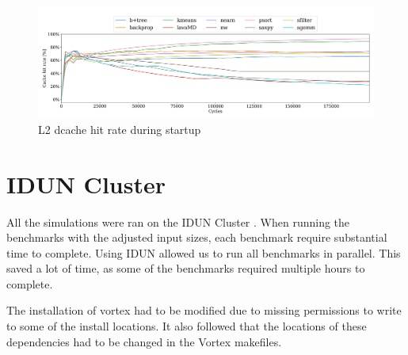 \begin{figure}
    \centering
    \includegraphics[width=\textwidth]{figures/L2cachehit_vlsim.png}
    \caption{L2 dcache hit rate during startup}
    \label{fig:l2_cache_hitrate}
\end{figure}

\section{IDUN Cluster}

All the simulations were ran on the IDUN Cluster \cite{Idun_tech_report}. When running the benchmarks with the adjusted input sizes, each benchmark require substantial time to complete. Using IDUN allowed us to run all benchmarks in parallel. This saved a lot of time, as some of the benchmarks required multiple hours to complete.

The installation of vortex had to be modified due to missing permissions to write to some of the install locations. It also followed that the locations of these dependencies had to be changed in the Vortex makefiles.